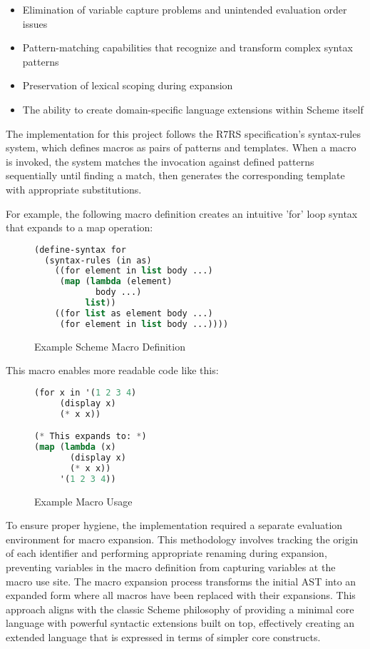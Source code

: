 \documentclass[final]{cmpreport_02}
\begin{document}
\begin{itemize}
    \item Elimination of variable capture problems and unintended evaluation order issues
    \item Pattern-matching capabilities that recognize and transform complex syntax patterns
    \item Preservation of lexical scoping during expansion
    \item The ability to create domain-specific language extensions within Scheme itself
\end{itemize}

The implementation for this project follows the R7RS specification's syntax-rules system, which defines macros as pairs of patterns and templates. When a macro is invoked, the system matches the invocation against defined patterns sequentially until finding a match, then generates the corresponding template with appropriate substitutions.

For example, the following macro definition creates an intuitive 'for' loop syntax that expands to a map operation:

\begin{figure}[h!]
\caption{Example Scheme Macro Definition}
\begin{lstlisting}[language=Lisp]
(define-syntax for
  (syntax-rules (in as)
    ((for element in list body ...)
     (map (lambda (element)
            body ...)
          list))
    ((for list as element body ...)
     (for element in list body ...))))
\end{lstlisting}
\end{figure}

This macro enables more readable code like this:

\begin{figure}[h!]
\caption{Example Macro Usage}
\begin{lstlisting}[language=Lisp]
(for x in '(1 2 3 4)
     (display x)
     (* x x))

(* This expands to: *)
(map (lambda (x)
       (display x)
       (* x x))
     '(1 2 3 4))

\end{lstlisting}
\end{figure}

To ensure proper hygiene, the implementation required a separate evaluation environment for macro expansion. This methodology involves tracking the origin of each identifier and performing appropriate renaming during expansion, preventing variables in the macro definition from capturing variables at the macro use site.
The macro expansion process transforms the initial AST into an expanded form where all macros have been replaced with their expansions. This approach aligns with the classic Scheme philosophy of providing a minimal core language with powerful syntactic extensions built on top, effectively creating an extended language that is expressed in terms of simpler core constructs.
\end{document}
